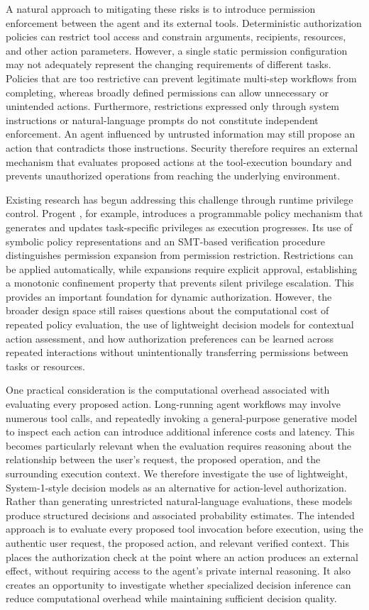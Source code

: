 \documentclass[10pt,conference]{IEEEtran}
\begin{document}
A natural approach to mitigating these risks is to introduce permission enforcement between the agent and its external tools. Deterministic authorization policies can restrict tool access and constrain arguments, recipients, resources, and other action parameters. However, a single static permission configuration may not adequately represent the changing requirements of different tasks. Policies that are too restrictive can prevent legitimate multi-step workflows from completing, whereas broadly defined permissions can allow unnecessary or unintended actions. Furthermore, restrictions expressed only through system instructions or natural-language prompts do not constitute independent enforcement. An agent influenced by untrusted information may still propose an action that contradicts those instructions. Security therefore requires an external mechanism that evaluates proposed actions at the tool-execution boundary and prevents unauthorized operations from reaching the underlying environment.

Existing research has begun addressing this challenge through runtime privilege control. Progent \cite{shi2025progent}, for example, introduces a programmable policy mechanism that generates and updates task-specific privileges as execution progresses. Its use of symbolic policy representations and an SMT-based verification procedure distinguishes permission expansion from permission restriction. Restrictions can be applied automatically, while expansions require explicit approval, establishing a monotonic confinement property that prevents silent privilege escalation. This provides an important foundation for dynamic authorization. However, the broader design space still raises questions about the computational cost of repeated policy evaluation, the use of lightweight decision models for contextual action assessment, and how authorization preferences can be learned across repeated interactions without unintentionally transferring permissions between tasks or resources.

One practical consideration is the computational overhead associated with evaluating every proposed action. Long-running agent workflows may involve numerous tool calls, and repeatedly invoking a general-purpose generative model to inspect each action can introduce additional inference costs and latency. This becomes particularly relevant when the evaluation requires reasoning about the relationship between the user's request, the proposed operation, and the surrounding execution context. We therefore investigate the use of lightweight, System-1-style decision models as an alternative for action-level authorization. Rather than generating unrestricted natural-language evaluations, these models produce structured decisions and associated probability estimates. The intended approach is to evaluate every proposed tool invocation before execution, using the authentic user request, the proposed action, and relevant verified context. This places the authorization check at the point where an action produces an external effect, without requiring access to the agent's private internal reasoning. It also creates an opportunity to investigate whether specialized decision inference can reduce computational overhead while maintaining sufficient decision quality.
\end{document}
